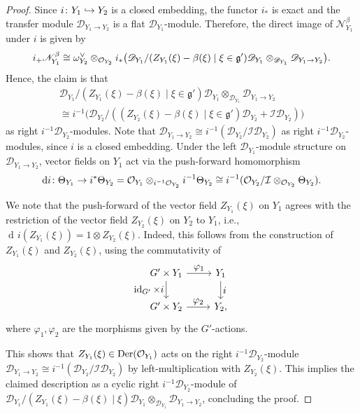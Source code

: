 \documentclass[11pt]{article}
\newcommand{\ie}{i.e.,\xspace}
\let\ts\textstyle
\newcommand\hto{\mathrel{\lhook\joinrel\to}}
\newcommand{\frg}{\mathfrak{g}}
\DeclareMathOperator{\Der}{\textup{Der}}
\DeclareMathOperator{\differential}{d\!}
\DeclareMathOperator{\id}{\textup{id}}
\begin{document}
\begin{proof}
Since $i \colon Y_1 \hto Y_2$ is a closed embedding, the functor $i_*$ is exact and the transfer module $\mathscr{D}_{Y_1 \to Y_2}$ is a flat $\mathscr{D}_{Y_1}$\nobreakdash-mod\-ule. Therefore, the direct image of $\mathscr N_{Y_1}^\beta$ under $i$ is given by
\[
i_+ \mathscr N_{Y_1}^\beta \cong \omega_{Y_2}^\vee \otimes_{\O_{Y_2}} i_*\big(\mathscr{D}_{Y_1}/(Z_{Y_1}(\xi)-\beta(\xi) \mid \xi \in \frg') \mathscr D_{Y_1} \otimes_{\mathscr{D}_{Y_1}} \mathscr{D}_{Y_1\to Y_2}\big).
\]
Hence, the claim is that
\begin{multline*}
\mathscr{D}_{Y_1}/(Z_{Y_1}(\xi)-\beta(\xi) \mid \xi \in \frg') \mathscr D_{Y_1} \otimes_{\mathscr{D}_{Y_1}} \mathscr{D}_{Y_1\to Y_2} \\
\cong i^{-1} \big(\mathscr{D}_{Y_2}/((Z_{Y_2}(\xi)-\beta(\xi)\mid \xi \in \frg') \mathscr{D}_{Y_2} + \mathcal I \mathscr{D}_{Y_2}) \big)
\end{multline*}
as right $i^{-1}\mathscr{D}_{Y_2}$\nobreakdash-mod\-ules.
Note that $\mathscr{D}_{Y_1\to Y_2} \cong i^{-1}(\mathscr{D}_{Y_2}/\mathcal I \mathscr{D}_{Y_2})$ as right $i^{-1} \mathscr{D}_{Y_2}$\nobreakdash-mod\-ules, since $i$ is a closed embedding. Under the left $\mathscr{D}_{Y_1}$\nobreakdash-mod\-ule structure on $\mathscr{D}_{Y_1\to Y_2}$, vector fields on $Y_1$ act via the push-forward homomorphism
\[
\differential i \colon \Theta_{Y_1} \to i^* \Theta_{Y_2} = \O_{Y_1} \otimes_{i^{-1} \O_{Y_2}} i^{-1} \Theta_{Y_2} \cong i^{-1}(\O_{Y_2}/\mathcal{I} \otimes_{\O_{Y_2}} \Theta_{Y_2}).
\]

We note that the push-forward of the vector field $Z_{Y_1}(\xi)$ on $Y_1$ agrees with the restriction of the vector field $Z_{Y_2}(\xi)$ on $Y_2$ to $Y_1$, \ie $\differential i(Z_{Y_1}(\xi)) = 1 \otimes Z_{Y_2}(\xi)$. Indeed, this follows from the construction of $Z_{Y_1}(\xi)$ and $Z_{Y_2}(\xi)$, using the commutativity of
\[
\begin{tikzcd}
G' \times Y_1 \ar{r}{\ts \varphi_1} \ar[swap]{d}{\ts \id_{G'} \times i} & Y_1 \ar{d}{\ts i} \\
G' \times Y_2 \ar{r}{\ts \varphi_2} & Y_2,
\end{tikzcd}
\]
where $\varphi_1, \varphi_2$ are the morphisms given by the $G'$-actions.

This shows that $Z_{Y_1}(\xi) \in \Der(\O_{Y_1})$ acts on the right $i^{-1} \mathscr D_{Y_2}$\nobreakdash-mod\-ule $\mathscr D_{Y_1 \to Y_2} \cong i^{-1}(\mathscr D_{Y_2}/\mathcal I \mathscr{D}_{Y_2})$ by left-multiplication with $Z_{Y_2}(\xi)$. This implies the claimed description as a cyclic right $i^{-1} \mathscr{D}_{Y_2}$\nobreakdash-mod\-ule of $\mathscr{D}_{Y_1}/(Z_{Y_1}(\xi)-\beta(\xi) \mid \xi) \mathscr D_{Y_1} \otimes_{\mathscr{D}_{Y_1}} \mathscr{D}_{Y_1\to Y_2}$, concluding the proof.
\end{proof}
\end{document}
